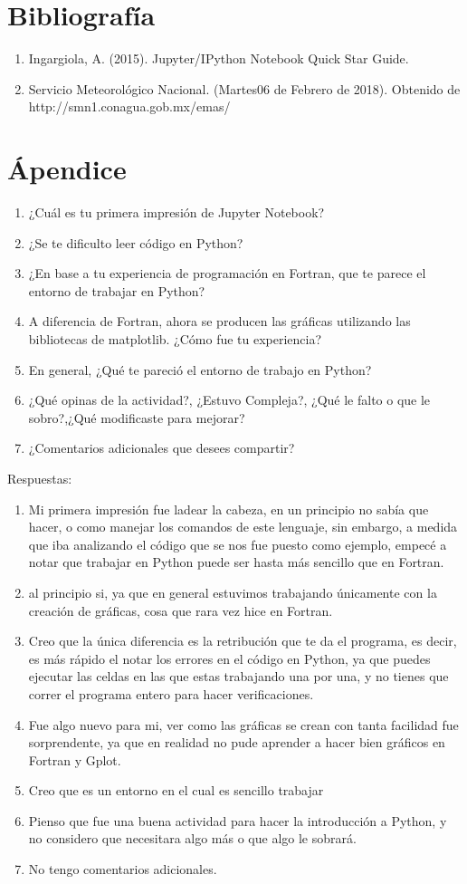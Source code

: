 \documentclass{article}
\begin{document}
\section{Bibliografía}

\begin {enumerate}
\item Ingargiola, A. (2015). Jupyter/IPython Notebook Quick Star Guide.
\item Servicio Meteorológico Nacional. (Martes06 de Febrero de 2018). Obtenido de http://smn1.conagua.gob.mx/emas/
\end{enumerate}

\section{Ápendice}
\begin{enumerate}
\item ¿Cuál es tu primera impresión de Jupyter Notebook?
\item ¿Se te dificulto leer código en Python?
\item ¿En base a tu experiencia de programación en Fortran, que te parece el entorno de trabajar en Python?
\item A diferencia de Fortran, ahora se producen las gráficas utilizando las bibliotecas de matplotlib. ¿Cómo fue tu experiencia?
\item En general, ¿Qué te pareció el entorno de trabajo en Python?
\item ¿Qué opinas de la actividad?, ¿Estuvo Compleja?, ¿Qué le falto o que le sobro?,¿Qué modificaste para mejorar?
\item ¿Comentarios adicionales que desees compartir?
\end{enumerate}

Respuestas:
\begin{enumerate}
\item Mi primera impresión fue ladear la cabeza, en un principio no sabía que hacer, o como manejar los comandos de este lenguaje, sin embargo, a medida que iba analizando el código que se nos fue puesto como ejemplo, empecé a notar que trabajar en Python puede ser hasta más sencillo que en Fortran.
\item al principio si, ya que en general estuvimos trabajando únicamente con la creación de gráficas, cosa que rara vez hice en Fortran.
\item Creo que la única diferencia es la retribución que te da el programa, es decir, es más rápido el notar los errores en el código en Python, ya que puedes ejecutar las celdas en las que estas trabajando una por una, y no tienes que correr el programa entero para hacer verificaciones.
\item Fue algo nuevo para mi, ver como las gráficas se crean con tanta facilidad fue sorprendente, ya que en realidad no pude aprender a hacer bien gráficos en Fortran y Gplot.
\item Creo que es un entorno en el cual es sencillo trabajar
\item Pienso que fue una buena actividad para hacer la introducción a Python, y no considero que necesitara algo más o que algo le sobrará.
\item No tengo comentarios adicionales.
\end{enumerate}
\end{document}
